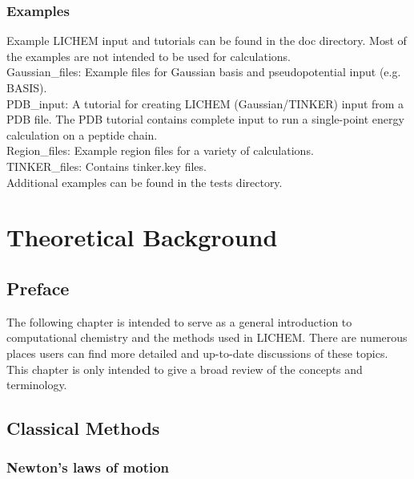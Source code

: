 \documentclass[12pt]{report}
\begin{document}
\subsection{Examples}

Example LICHEM input and tutorials can be found in the doc directory.
Most of the examples are not intended to be used for calculations. \\

Gaussian\_files: Example files for Gaussian basis and pseudopotential
input (e.g. BASIS). \\

PDB\_input: A tutorial for creating LICHEM (Gaussian/TINKER) input from a
PDB file.
The PDB tutorial contains complete input to run a single-point energy
calculation on a peptide chain. \\

Region\_files: Example region files for a variety of calculations. \\

TINKER\_files: Contains tinker.key files. \\

Additional examples can be found in the tests directory.

\chapter{Theoretical Background}
\label{chap:Theory}

\section{Preface}

The following chapter is intended to serve as a general introduction to
computational chemistry and the methods used in LICHEM.
There are numerous places users can find more detailed and up-to-date
discussions of these topics.
This chapter is only intended to give a broad review of the concepts and
terminology.

\section{Classical Methods}

\subsection{Newton's laws of motion}
\end{document}
